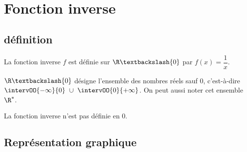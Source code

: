 \section{Fonction inverse}
    \subsection{définition}
    \begin{bdefi}
        La fonction inverse $f$ est définie sur $\R\textbackslash\{0\}$ par $f(x)= \dfrac{1}{x}$.
    \end{bdefi}
    
    \begin{brmqs}
        \begin{itemRem}
            \item $\R\textbackslash\{0\}$ désigne l'ensemble des nombres réels sauf 0, c'est-à-dire 
            $\intervOO{-\infty}{0}\  \cup \  \intervOO{0}{+\infty}$. On peut aussi noter cet ensemble $\R^*$.
            \item La fonction inverse n'est pas définie en 0.
        \end{itemRem}
    \end{brmqs}
    
    \subsection{Représentation graphique}
    
